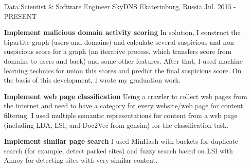 


\begin{cventries}


\cventry
{Data Scientist \& Software Engineer} %
{SkyDNS} %
{Ekaterinburg, Russia} %
{Jul. 2015 - PRESENT} %
{ %
\begin{cvitems}
\item {\textbf{Implement malicious domain activity scoring} \newline In solution, I construct the bipartite graph (users and domains) and calculate several suspicious and non-suspicious score for a graph (an iterative process, which transfers score from domains to users and back) and some other features. After that, I used machine learning technics for union this scores and predict the final suspicious score. On the basis of this development, I wrote my graduation work.}
\item {\textbf{Implement web page classification} \newline Using a crawler to collect web pages from the internet and need to have a category for every website/web page for content filtering. I used multiple semantic representations for content from a web page  (including LDA, LSI, and Doc2Vec from gensim) for the classification task.}
\item {\textbf{Implement similar page search} \newline I used MinHash with buckets for duplicate search (for example, detect parked sites) and fuzzy search based on LSI with Annoy for detecting sites with very similar content.}
\end{cvitems}
}


\end{cventries}